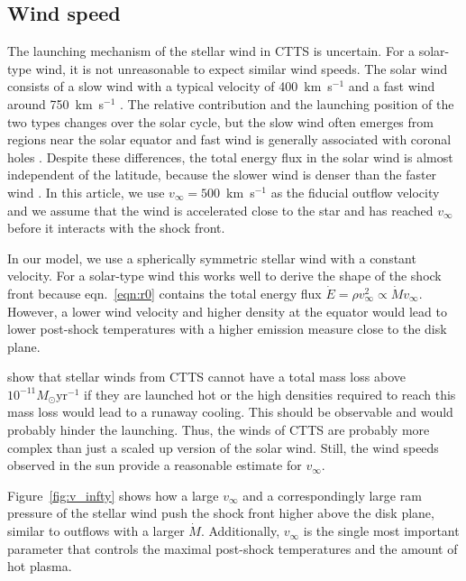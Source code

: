 \subsection{Wind speed}
The launching mechanism of the stellar wind in CTTS is uncertain. For a solar-type wind, it is not unreasonable to expect similar wind speeds. The solar wind consists of a slow wind with a typical velocity of 400~km~s$^{-1}$ and a fast wind around 750~km~s$^{-1}$ \citep{2005JGRA..110.7109F}. The relative contribution and the launching position of the two types changes over the solar cycle, but the slow wind often emerges from regions near the solar equator and fast wind is generally associated with coronal holes \citep{1999GeoRL..26.2901G,2003A&A...408.1165B,2009LRSP....6....3C}. Despite these differences, the total energy flux in the solar wind is almost independent of the latitude, because the slower wind is denser than the faster wind \citep{2012SoPh..279..197L}. In this article, we use $v_\infty=500$~km~s$^{-1}$ as the fiducial outflow velocity and we assume that the wind is accelerated close to the star and has reached $v_\infty$ before it interacts with the shock front.

In our model, we use a spherically symmetric stellar wind with a constant velocity. For a solar-type wind this works well to derive the shape of the shock front because eqn.~\ref{eqn:r0} contains the total energy flux $\dot E = \rho v^2_\infty \propto \dot M v_\infty$. However, a lower wind velocity and higher density at the equator would lead to lower post-shock temperatures with a higher emission measure close to the disk plane.

\citet{2007IAUS..243..299M} show that stellar winds from CTTS cannot have a total mass loss above $10^{-11}M_\odot\mathrm{ yr}^{-1}$ if they are launched hot or the high densities required to reach this mass loss would lead to a runaway cooling. This should be observable and would probably hinder the launching. Thus, the winds of CTTS are probably more complex than just a scaled up version of the solar wind. Still, the wind speeds observed in the sun provide a reasonable estimate for $v_\infty$.

Figure~\ref{fig:v_infty} shows how a large $v_\infty$ and a correspondingly large ram pressure of the stellar wind push the shock front higher above the disk plane, similar to outflows with a larger $\dot M$. Additionally, $v_\infty$ is the single most important parameter that controls the maximal post-shock temperatures and the amount of hot plasma.